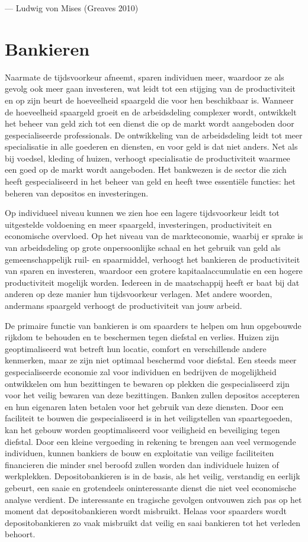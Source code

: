 \documentclass[
  a5paper,
  smalldemyvopaper,11pt,twoside,onecolumn,openright,extrafontsizes,
hidelinks]{memoir}
\begin{document}
--- Ludwig von Mises (Greaves 2010)

\section{Bankieren}\label{bankieren}

Naarmate de tijdsvoorkeur afneemt, sparen individuen meer, waardoor ze
als gevolg ook meer gaan investeren, wat leidt tot een stijging van de
productiviteit en op zijn beurt de hoeveelheid spaargeld die voor hen
beschikbaar is. Wanneer de hoeveelheid spaargeld groeit en de
arbeidsdeling complexer wordt, ontwikkelt het beheer van geld zich tot
een dienst die op de markt wordt aangeboden door gespecialiseerde
professionals. De ontwikkeling van de arbeidsdeling leidt tot meer
specialisatie in alle goederen en diensten, en voor geld is dat niet
anders. Net als bij voedsel, kleding of huizen, verhoogt specialisatie
de productiviteit waarmee een goed op de markt wordt aangeboden. Het
bankwezen is de sector die zich heeft gespecialiseerd in het beheer van
geld en heeft twee essentiële functies: het beheren van depositos en
investeringen.

Op individueel niveau kunnen we zien hoe een lagere tijdsvoorkeur leidt
tot uitgestelde voldoening en meer spaargeld, investeringen,
productiviteit en economische overvloed. Op het niveau van de
markteconomie, waarbij er sprake is van arbeidsdeling op grote
onpersoonlijke schaal en het gebruik van geld als gemeenschappelijk
ruil- en spaarmiddel, verhoogt het bankieren de productiviteit van
sparen en investeren, waardoor een grotere kapitaalaccumulatie en een
hogere productiviteit mogelijk worden. Iedereen in de maatschappij heeft
er baat bij dat anderen op deze manier hun tijdsvoorkeur verlagen. Met
andere woorden, andermans spaargeld verhoogt de productiviteit van jouw
arbeid.

De primaire functie van bankieren is om spaarders te helpen om hun
opgebouwde rijkdom te behouden en te beschermen tegen diefstal en
verlies. Huizen zijn geoptimaliseerd wat betreft hun locatie, comfort en
verschillende andere kenmerken, maar ze zijn niet optimaal beschermd
voor diefstal. Een steeds meer gespecialiseerde economie zal voor
individuen en bedrijven de mogelijkheid ontwikkelen om hun bezittingen
te bewaren op plekken die gespecialiseerd zijn voor het veilig bewaren
van deze bezittingen. Banken zullen depositos accepteren en hun
eigenaren laten betalen voor het gebruik van deze diensten. Door een
faciliteit te bouwen die gespecialiseerd is in het veiligstellen van
spaartegoeden, kan het gebouw worden geoptimaliseerd voor veiligheid en
beveiliging tegen diefstal. Door een kleine vergoeding in rekening te
brengen aan veel vermogende individuen, kunnen bankiers de bouw en
exploitatie van veilige faciliteiten financieren die minder snel beroofd
zullen worden dan individuele huizen of werkplekken. Depositobankieren
is in de basis, als het veilig, verstandig en eerlijk gebeurt, een saaie
en grotendeels oninteressante dienst die niet veel economische analyse
verdient. De interessante en tragische gevolgen ontvouwen zich pas op
het moment dat depositobankieren wordt misbruikt. Helaas voor spaarders
wordt depositobankieren zo vaak misbruikt dat veilig en saai bankieren
tot het verleden behoort.
\end{document}
